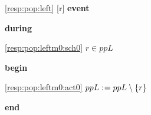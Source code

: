 \noindent \ref{resp:pop:left} [r] \textbf{event}
\begin{block}
  \item   \textbf{during}
  \begin{block}
  \item[ \eqref{resp:pop:leftm0:sch0} ]{$r \in ppL $} %
  \end{block}
  \item   \textbf{begin}
  \begin{block}
  \item[ \eqref{resp:pop:leftm0:act0} ]{$ppL \mathrel{:\mkern1mu=} ppL \setminus \{ r \} $} %
  \end{block}
  \item   \textbf{end} \\
\end{block}
